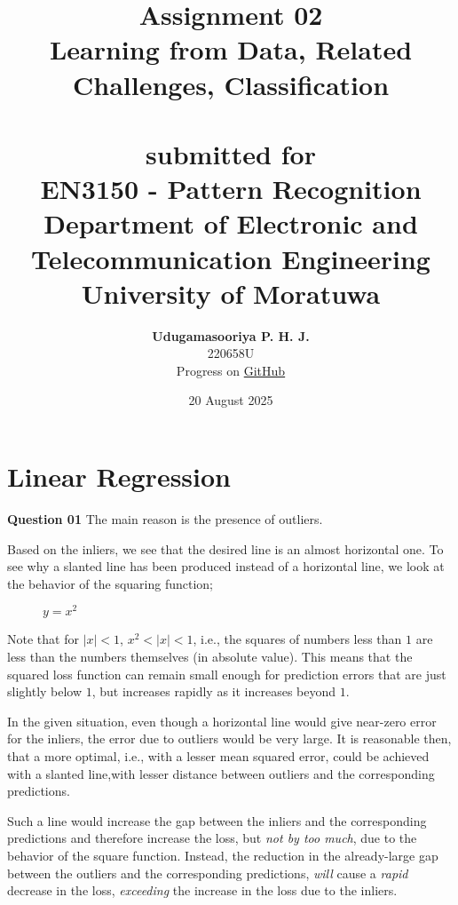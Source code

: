\documentclass{article}[a4paper]
\title{
	\huge{\textbf{
		Assignment 02
	}}\\
	\Large{
		Learning from Data, Related Challenges, Classification
	}\\
	\large{\phantom{}}\\
	\large{
		submitted for
	}\\
	\LARGE{
		\textbf{EN3150 - Pattern Recognition}
	}\\
	\large{
		Department of Electronic and Telecommunication Engineering
	}
	\\
	\large{University of Moratuwa}
}
\author{
	\textbf{Udugamasooriya P. H. J.}\\
	220658U\\
	\small{Progress on \href{https://github.com/pulasthi-u/en3150-assignment02}{GitHub \extlink}}
}
\date{20 August 2025}
\begin{document}
	\maketitle

	\section{Linear Regression}

	\textbf{Question 01} The main reason is the presence of outliers.
	
	Based on the inliers, we see that the desired line is an almost horizontal one. To see why a slanted line has been produced instead of a horizontal line, we look at the behavior of the squaring function;
	\begin{figure}[H]
		\centering
		\caption{$y = x^2$}
	\end{figure}
	Note that for $|x| < 1$, $x^2 < |x| < 1$, i.e., the squares of numbers less than $1$ are less than the numbers themselves (in absolute value). This means that the squared loss function can remain small enough for prediction errors that are just slightly below $1$, but increases rapidly as it increases beyond $1$.
	\newline

	In the given situation, even though a horizontal line would give near-zero error for the inliers, the error due to outliers would be very large. It is reasonable then, that a more optimal, i.e., with a lesser mean squared error, could be achieved with a slanted line,with lesser distance between outliers and the corresponding predictions.
	\newline

	Such a line would increase the gap between the inliers and the corresponding predictions and therefore increase the loss, but \textit{not by too much}, due to the behavior of the square function. Instead, the reduction in the already-large gap between the outliers and the corresponding predictions, \textit{will} cause a \textit{rapid} decrease in the loss, \textit{exceeding} the increase in the loss due to the inliers.
	\newline
		
\end{document}

